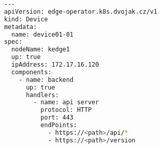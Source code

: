 \begin{lstfloat}
\begin{lstlisting}[language=bash, caption={Ukázka CRD Device}, label={sample:device}]
---
apiVersion: edge-operator.k8s.dvojak.cz/v1
kind: Device
metadata:
  name: device01-01
spec:
  nodeName: kedge1
  up: true
  ipAddress: 172.17.16.120
  components:
    - name: backend
      up: true
      handlers:
        - name: api server
          protocol: HTTP
          port: 443
          endPoints:
            - https://<path>/api/*
            - https://<path>/version
\end{lstlisting}
\end{lstfloat}